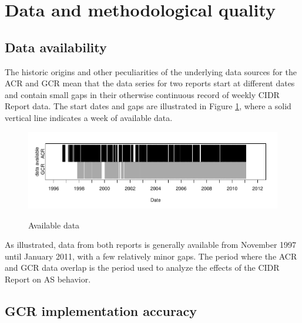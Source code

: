 \section{Data and methodological quality}

\subsection{Data availability}

The historic origins and other peculiarities of the underlying data sources for
the ACR and GCR mean that the data series for two reports start at different
dates and contain small gaps in their otherwise continuous record of weekly
CIDR Report data. The start dates and gaps are illustrated in Figure
\ref{fig:avail_data}, where a solid vertical line indicates a week of available
data.

\begin{figure}[h!]
\begin{centering}
\begin{singlespace}
    \includegraphics[width=6in]{figures/data_avail.pdf}
    \vspace{-2em}\\
    \caption{Available data}
    \label{fig:avail_data}
\end{singlespace}
\end{centering}
\end{figure}

As illustrated, data from both reports is generally available from November 1997
until January 2011, with a few relatively minor gaps. The period where the ACR
and GCR data overlap is the period used to analyze the effects of the CIDR
Report on AS behavior.


\subsection{GCR implementation accuracy}

